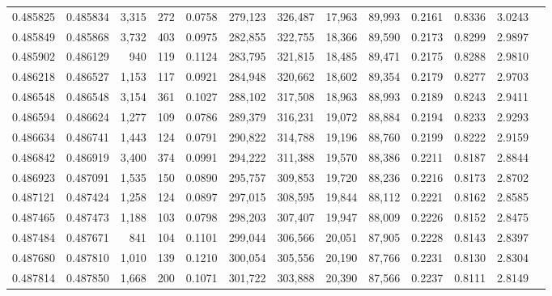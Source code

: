 \begin{tabular}{rrrrrrrrrrrrr}
0.485825 & 0.485834 & 3,315 &   272 &                                     0.0758 & 279,123 & 326,487 &  17,963 &  89,993 & 0.2161 & 0.8336 & 3.0243 \\
0.485849 & 0.485868 & 3,732 &   403 &                                     0.0975 & 282,855 & 322,755 &  18,366 &  89,590 & 0.2173 & 0.8299 & 2.9897 \\
0.485902 & 0.486129 &   940 &   119 &                                     0.1124 & 283,795 & 321,815 &  18,485 &  89,471 & 0.2175 & 0.8288 & 2.9810 \\
0.486218 & 0.486527 & 1,153 &   117 &                                     0.0921 & 284,948 & 320,662 &  18,602 &  89,354 & 0.2179 & 0.8277 & 2.9703 \\
0.486548 & 0.486548 & 3,154 &   361 &                                     0.1027 & 288,102 & 317,508 &  18,963 &  88,993 & 0.2189 & 0.8243 & 2.9411 \\
0.486594 & 0.486624 & 1,277 &   109 &                                     0.0786 & 289,379 & 316,231 &  19,072 &  88,884 & 0.2194 & 0.8233 & 2.9293 \\
0.486634 & 0.486741 & 1,443 &   124 &                                     0.0791 & 290,822 & 314,788 &  19,196 &  88,760 & 0.2199 & 0.8222 & 2.9159 \\
0.486842 & 0.486919 & 3,400 &   374 &                                     0.0991 & 294,222 & 311,388 &  19,570 &  88,386 & 0.2211 & 0.8187 & 2.8844 \\
0.486923 & 0.487091 & 1,535 &   150 &                                     0.0890 & 295,757 & 309,853 &  19,720 &  88,236 & 0.2216 & 0.8173 & 2.8702 \\
0.487121 & 0.487424 & 1,258 &   124 &                                     0.0897 & 297,015 & 308,595 &  19,844 &  88,112 & 0.2221 & 0.8162 & 2.8585 \\
0.487465 & 0.487473 & 1,188 &   103 &                                     0.0798 & 298,203 & 307,407 &  19,947 &  88,009 & 0.2226 & 0.8152 & 2.8475 \\
0.487484 & 0.487671 &   841 &   104 &                                     0.1101 & 299,044 & 306,566 &  20,051 &  87,905 & 0.2228 & 0.8143 & 2.8397 \\
0.487680 & 0.487810 & 1,010 &   139 &                                     0.1210 & 300,054 & 305,556 &  20,190 &  87,766 & 0.2231 & 0.8130 & 2.8304 \\
0.487814 & 0.487850 & 1,668 &   200 &                                     0.1071 & 301,722 & 303,888 &  20,390 &  87,566 & 0.2237 & 0.8111 & 2.8149 \\

\end{tabular}
